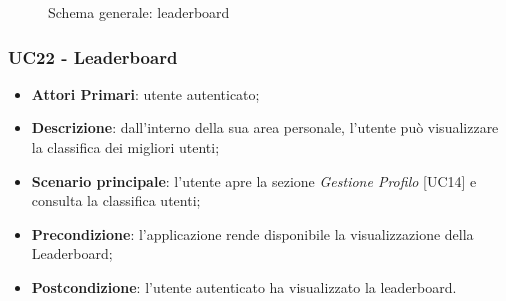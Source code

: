 \begin{figure}[h]
	\centering
	\caption{Schema generale: leaderboard}
\end{figure}
\subsubsection{UC22 - Leaderboard}
\begin{itemize}
	\item \textbf{Attori Primari}: utente autenticato;
	\item \textbf{Descrizione}: dall'interno della sua area personale, l'utente può visualizzare la classifica dei migliori utenti;
	\item \textbf{Scenario principale}: l'utente apre la sezione \textit{Gestione Profilo} [UC14] e consulta la classifica utenti;
	\item \textbf{Precondizione}: l'applicazione rende disponibile la visualizzazione della Leaderboard\glosp;
	\item \textbf{Postcondizione}: l'utente autenticato ha visualizzato la leaderboard.
\end{itemize}

